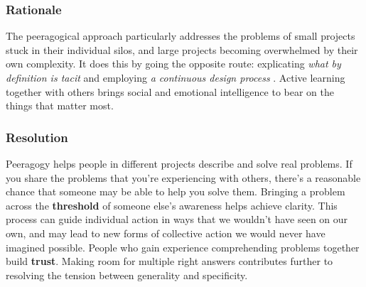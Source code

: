 \subsubsection*{Rationale}
The peeragogical approach particularly addresses the problems of small projects stuck in their individual silos, and large projects becoming overwhelmed by their own complexity.  It does this by going the opposite route: explicating \emph{what by definition is tacit} and employing \emph{a continuous design process} \cite[pp. 9--10]{schummer2014beyond}.   Active learning together with others brings social and emotional intelligence to bear on the things that matter most.

\subsubsection*{Resolution}

Peeragogy helps people in different projects describe and solve real problems. 
If you share the problems that you're experiencing with others, there's a reasonable chance that someone may be able to help you solve them.  Bringing a problem across the \textbf{threshold} of someone else's awareness helps achieve clarity.  
This process can guide individual action in ways that we wouldn't have seen on our own, and may lead to new forms of collective action we would never have imagined possible.  People who gain experience comprehending problems together build \textbf{trust}.
%
Making room for multiple right answers contributes further to resolving the tension between generality and specificity.



